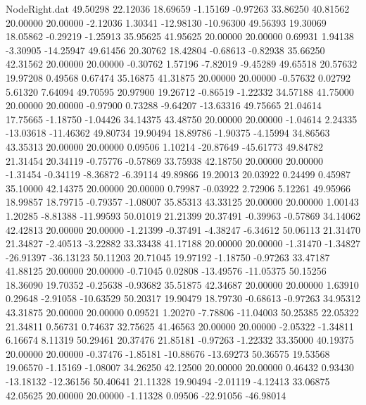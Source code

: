 \begin{filecontents}{NodeRight.dat}
  49.50298   22.12036   18.69659    -1.15169   -0.97263   33.86250   40.81562   20.00000   20.00000   -2.12036    1.30341  -12.98130  -10.96300
  49.56393   19.30069   18.05862    -0.29219   -1.25913   35.95625   41.95625   20.00000   20.00000    0.69931    1.94138   -3.30905  -14.25947
  49.61456   20.30762   18.42804    -0.68613   -0.82938   35.66250   42.31562   20.00000   20.00000   -0.30762    1.57196   -7.82019   -9.45289
  49.65518   20.57632   19.97208     0.49568    0.67474   35.16875   41.31875   20.00000   20.00000   -0.57632    0.02792    5.61320    7.64094
  49.70595   20.97900   19.26712    -0.86519   -1.22332   34.57188   41.75000   20.00000   20.00000   -0.97900    0.73288   -9.64207  -13.63316
  49.75665   21.04614   17.75665    -1.18750   -1.04426   34.14375   43.48750   20.00000   20.00000   -1.04614    2.24335  -13.03618  -11.46362
  49.80734   19.90494   18.89786    -1.90375   -4.15994   34.86563   43.35313   20.00000   20.00000    0.09506    1.10214  -20.87649  -45.61773
  49.84782   21.31454   20.34119    -0.75776   -0.57869   33.75938   42.18750   20.00000   20.00000   -1.31454   -0.34119   -8.36872   -6.39114
  49.89866   19.20013   20.03922     0.24499    0.45987   35.10000   42.14375   20.00000   20.00000    0.79987   -0.03922    2.72906    5.12261
  49.95966   18.99857   18.79715    -0.79357   -1.08007   35.85313   43.33125   20.00000   20.00000    1.00143    1.20285   -8.81388  -11.99593
  50.01019   21.21399   20.37491    -0.39963   -0.57869   34.14062   42.42813   20.00000   20.00000   -1.21399   -0.37491   -4.38247   -6.34612
  50.06113   21.31470   21.34827    -2.40513   -3.22882   33.33438   41.17188   20.00000   20.00000   -1.31470   -1.34827  -26.91397  -36.13123
  50.11203   20.71045   19.97192    -1.18750   -0.97263   33.47187   41.88125   20.00000   20.00000   -0.71045    0.02808  -13.49576  -11.05375
  50.15256   18.36090   19.70352    -0.25638   -0.93682   35.51875   42.34687   20.00000   20.00000    1.63910    0.29648   -2.91058  -10.63529
  50.20317   19.90479   18.79730    -0.68613   -0.97263   34.95312   43.31875   20.00000   20.00000    0.09521    1.20270   -7.78806  -11.04003
  50.25385   22.05322   21.34811     0.56731    0.74637   32.75625   41.46563   20.00000   20.00000   -2.05322   -1.34811    6.16674    8.11319
  50.29461   20.37476   21.85181    -0.97263   -1.22332   33.35000   40.19375   20.00000   20.00000   -0.37476   -1.85181  -10.88676  -13.69273
  50.36575   19.53568   19.06570    -1.15169   -1.08007   34.26250   42.12500   20.00000   20.00000    0.46432    0.93430  -13.18132  -12.36156
  50.40641   21.11328   19.90494    -2.01119   -4.12413   33.06875   42.05625   20.00000   20.00000   -1.11328    0.09506  -22.91056  -46.98014

\end{filecontents}
